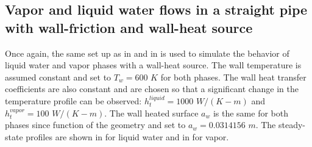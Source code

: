 \subsection{Vapor and liquid water flows in a straight pipe with wall-friction and wall-heat source} \label{sec:1d-wall-heat-source}
Once again, the same set up as in  and in  is used to simulate the behavior of liquid water and vapor phases with a wall-heat source. The wall temperature is assumed constant and set to $T_w=600$ $K$ for both phases. The wall heat transfer coefficients are also constant and are chosen so that a significant change in the temperature profile can be observed: $h_t^{liquid} = 1000$ $W/(K-m)$ and $h_t^{vapor} = 100$ $W/(K-m)$. The wall heated surface $a_w$ is the same for both phases since function of the geometry and set to $a_w = 0.0314156$ $m$. The steady-state profiles are shown in  for liquid water and in  for vapor. 
%
